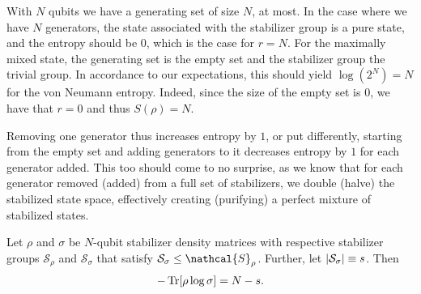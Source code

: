 With $N$ qubits we have a generating set of size $N$, at most. In the case
where we have $N$ generators, the state associated with the stabilizer group is
a pure state, and the entropy should be $0$, which is the case for $r=N$. For
the maximally mixed state, the generating set is the empty set and the
stabilizer group the trivial group. In accordance to our expectations, this
should yield $\log(2^N)= N$ for the von Neumann entropy. Indeed, since the size of
the empty set is $0$, we have that $r=0$ and thus $S(\rho) = N$.

Removing one generator thus increases entropy by $1$, or put differently,
starting from the empty set and adding generators to it decreases entropy by
$1$ for each generator added. This too should come to no surprise, as we know
that for each generator removed (added) from a full set of stabilizers, we
double (halve) the stabilized state space, effectively creating (purifying) a
perfect mixture of stabilized states.

\begin{thm}\label{thm:cross-ent-stab}
  Let $\rho$ and $\sigma$ be $N$-qubit stabilizer density matrices with
  respective stabilizer groups $\mathcal{S}_\rho$ and $\mathcal{S}_\sigma$ that
  satisfy $\mathcal{S}_\sigma \leq
  \nathcal{S}_\rho$. Further, let $\abs{\mathcal{S}_\sigma} \equiv s$. Then
  \begin{align}\label{eq:cross-ent-stab}
    -\Tr[\rho\log\sigma] = N - s
  .\end{align}
\end{thm}


